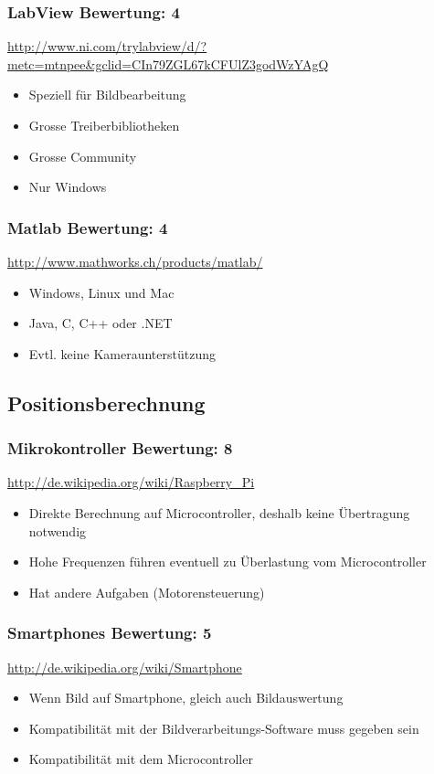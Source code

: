 \subsubsection{LabView  \hfill Bewertung: 4}
\url{http://www.ni.com/trylabview/d/?metc=mtnpee&gclid=CIn79ZGL67kCFUlZ3godWzYAgQ}
\begin{itemize}
    \item Speziell für Bildbearbeitung
    \item Grosse Treiberbibliotheken
    \item Grosse Community
    \item Nur Windows
\end{itemize}

\subsubsection{Matlab  \hfill Bewertung: 4}
\url{http://www.mathworks.ch/products/matlab/}
\begin{itemize}
    \item Windows, Linux und Mac
    \item Java, C, C++ oder .NET
    \item Evtl. keine Kameraunterstützung
\end{itemize}

\subsection{Positionsberechnung}

\subsubsection{Mikrokontroller  \hfill Bewertung: 8}
\url{http://de.wikipedia.org/wiki/Raspberry_Pi}
\begin{itemize}
    \item Direkte Berechnung auf Microcontroller, deshalb keine Übertragung notwendig
    \item Hohe Frequenzen führen eventuell zu Überlastung vom Microcontroller
    \item Hat andere Aufgaben (Motorensteuerung)
\end{itemize}

\subsubsection{Smartphones  \hfill Bewertung: 5}
\url{http://de.wikipedia.org/wiki/Smartphone}
\begin{itemize}
    \item Wenn Bild auf Smartphone, gleich auch Bildauswertung
    \item Kompatibilität mit der Bildverarbeitungs-Software muss gegeben sein
    \item Kompatibilität mit dem Microcontroller
\end{itemize}

